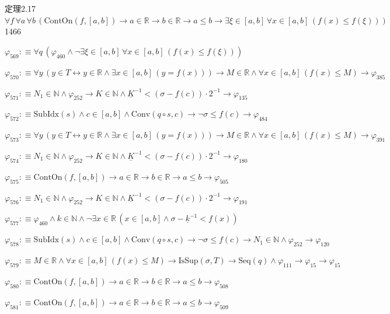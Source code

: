 \begin{fullproof}{定理2.17}{$\forall f\,\forall a\,\forall b\,(\mathrm{ContOn}(f,[a,b]) \to a \in \mathbb{R} \to b \in \mathbb{R} \to a \leq b \to \exists \xi \in [a,b]\,\forall x \in [a,b]\,(f(x) \leq f(\xi)))$}{1466}
\begin{abbrevlist}
\item $\varphi_{569} :\equiv \forall q\,(\varphi_{460} \land \neg \exists \xi \in [a,b]\,\forall x \in [a,b]\,(f(x) \leq f(\xi)))$
\item $\varphi_{570} :\equiv \forall y\,(y \in T \leftrightarrow y \in \mathbb{R} \land \exists x \in [a,b]\,(y = f(x))) \to M \in \mathbb{R} \land \forall x \in [a,b]\,(f(x) \leq M) \to \varphi_{385}$
\item $\varphi_{571} :\equiv N_{1} \in \mathbb{N} \land \varphi_{252} \to K \in \mathbb{N} \land \underline{K}^{-1} < (\sigma - f(c)) \cdot 2^{-1} \to \varphi_{135}$
\item $\varphi_{572} :\equiv \mathrm{SubIdx}(s) \land c \in [a,b] \land \mathrm{Conv}(q \circ s,c) \to \neg \sigma \leq f(c) \to \varphi_{484}$
\item $\varphi_{573} :\equiv \forall y\,(y \in T \leftrightarrow y \in \mathbb{R} \land \exists x \in [a,b]\,(y = f(x))) \to M \in \mathbb{R} \land \forall x \in [a,b]\,(f(x) \leq M) \to \varphi_{391}$
\item $\varphi_{574} :\equiv N_{1} \in \mathbb{N} \land \varphi_{252} \to K \in \mathbb{N} \land \underline{K}^{-1} < (\sigma - f(c)) \cdot 2^{-1} \to \varphi_{180}$
\item $\varphi_{575} :\equiv \mathrm{ContOn}(f,[a,b]) \to a \in \mathbb{R} \to b \in \mathbb{R} \to a \leq b \to \varphi_{505}$
\item $\varphi_{576} :\equiv N_{1} \in \mathbb{N} \land \varphi_{252} \to K \in \mathbb{N} \land \underline{K}^{-1} < (\sigma - f(c)) \cdot 2^{-1} \to \varphi_{191}$
\item $\varphi_{577} :\equiv \varphi_{460} \land k \in \mathbb{N} \land \neg \exists x \in \mathbb{R}\,(x \in [a,b] \land \sigma - \underline{k}^{-1} < f(x))$
\item $\varphi_{578} :\equiv \mathrm{SubIdx}(s) \land c \in [a,b] \land \mathrm{Conv}(q \circ s,c) \to \neg \sigma \leq f(c) \to N_{1} \in \mathbb{N} \land \varphi_{252} \to \varphi_{120}$
\item $\varphi_{579} :\equiv M \in \mathbb{R} \land \forall x \in [a,b]\,(f(x) \leq M) \to \mathrm{IsSup}(\sigma,T) \to \mathrm{Seq}(q) \land \varphi_{111} \to \varphi_{15} \to \varphi_{15}$
\item $\varphi_{580} :\equiv \mathrm{ContOn}(f,[a,b]) \to a \in \mathbb{R} \to b \in \mathbb{R} \to a \leq b \to \varphi_{508}$
\item $\varphi_{581} :\equiv \mathrm{ContOn}(f,[a,b]) \to a \in \mathbb{R} \to b \in \mathbb{R} \to a \leq b \to \varphi_{509}$

\end{abbrevlist}
\end{fullproof}
